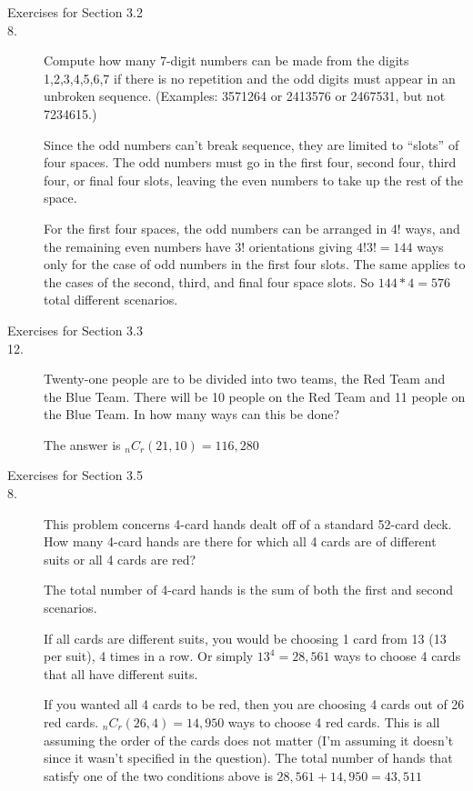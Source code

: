 \documentclass[10pt]{article}
\begin{document}
\begin{description}
\item[Exercises for Section 3.2]

\item[8.] Compute how many 7-digit numbers can be made from the digits
  1,2,3,4,5,6,7 if there is no repetition and the odd digits
  must appear in an unbroken sequence.  (Examples: 3571264 or 2413576 or
  2467531, but not 7234615.)

Since the odd numbers can’t break sequence, they are limited to “slots” of four spaces. 
The odd numbers must go in the first four, second four, third four, or final four slots, 
leaving the even numbers to take up the rest of the space. 

For the first four spaces, the odd numbers can be arranged in 4! ways, and the remaining 
even numbers have $3!$ orientations giving $4!3! = 144$ ways only for the case of odd numbers 
in the first four slots. The same applies to the cases of the second, third, and final four 
space slots. So $144 * 4 = 576$ total different scenarios.

\item[Exercises for Section 3.3]

\item[12.] Twenty-one people are to be divided into two teams, the Red
  Team and the Blue Team.  There will be 10 people on the Red Team and
  11 people on the Blue Team.  In how many ways can this be done?

The answer is $_nC_r(21, 10) = 116,280$

\item[Exercises for Section 3.5]


\item[8.] This problem concerns 4-card hands dealt off of a standard
  52-card deck.  How many 4-card hands are there for which all 4 cards
  are of different suits or all 4 cards are red?


The total number of 4-card hands is the sum of both the first and second scenarios.

If all cards are different suits, you would be choosing 1 card from 13 (13 per suit), 
4 times in a row. Or simply $13^4 = 28,561$ ways to choose 4 cards that all have different suits.

If you wanted all 4 cards to be red, then you are choosing 4 cards out of 26 red cards. $_nC_r(26, 4) = 14,950$ ways to choose 4 red cards. 
This is all assuming the order of the cards does not matter (I’m assuming it doesn’t since it wasn’t specified in the question).
The total number of hands that satisfy one of the two conditions above is $28,561 + 14,950 = 43,511$



\end{description}
\end{document}
